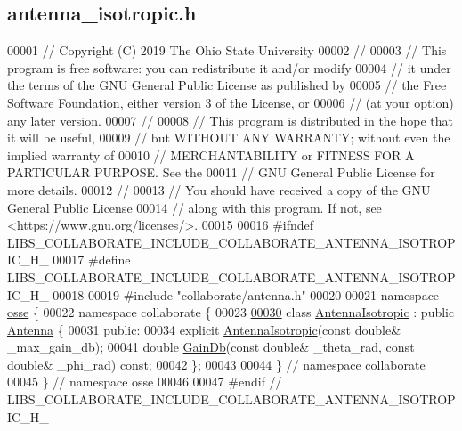 \hypertarget{antenna__isotropic_8h_source}{}\subsection{antenna\+\_\+isotropic.\+h}
\label{antenna__isotropic_8h_source}

\begin{DoxyCode}
00001 \textcolor{comment}{// Copyright (C) 2019 The Ohio State University}
00002 \textcolor{comment}{//}
00003 \textcolor{comment}{// This program is free software: you can redistribute it and/or modify}
00004 \textcolor{comment}{// it under the terms of the GNU General Public License as published by}
00005 \textcolor{comment}{// the Free Software Foundation, either version 3 of the License, or}
00006 \textcolor{comment}{// (at your option) any later version.}
00007 \textcolor{comment}{//}
00008 \textcolor{comment}{// This program is distributed in the hope that it will be useful,}
00009 \textcolor{comment}{// but WITHOUT ANY WARRANTY; without even the implied warranty of}
00010 \textcolor{comment}{// MERCHANTABILITY or FITNESS FOR A PARTICULAR PURPOSE.  See the}
00011 \textcolor{comment}{// GNU General Public License for more details.}
00012 \textcolor{comment}{//}
00013 \textcolor{comment}{// You should have received a copy of the GNU General Public License}
00014 \textcolor{comment}{// along with this program.  If not, see <https://www.gnu.org/licenses/>.}
00015 
00016 \textcolor{preprocessor}{#ifndef LIBS\_COLLABORATE\_INCLUDE\_COLLABORATE\_ANTENNA\_ISOTROPIC\_H\_}
00017 \textcolor{preprocessor}{#define LIBS\_COLLABORATE\_INCLUDE\_COLLABORATE\_ANTENNA\_ISOTROPIC\_H\_}
00018 
00019 \textcolor{preprocessor}{#include "collaborate/antenna.h"}
00020 
00021 \textcolor{keyword}{namespace }\hyperlink{namespaceosse}{osse} \{
00022 \textcolor{keyword}{namespace }collaborate \{
00023 
\hyperlink{classosse_1_1collaborate_1_1_antenna_isotropic}{00030} \textcolor{keyword}{class }\hyperlink{classosse_1_1collaborate_1_1_antenna_isotropic}{AntennaIsotropic} : \textcolor{keyword}{public} \hyperlink{classosse_1_1collaborate_1_1_antenna}{Antenna} \{
00031  \textcolor{keyword}{public}:
00034   \textcolor{keyword}{explicit} \hyperlink{classosse_1_1collaborate_1_1_antenna_isotropic_ae431744ad97d6b0a1d25039e94b4ffcb}{AntennaIsotropic}(\textcolor{keyword}{const} \textcolor{keywordtype}{double}& \_max\_gain\_db);
00041   \textcolor{keywordtype}{double} \hyperlink{classosse_1_1collaborate_1_1_antenna_isotropic_ab695187eb238b78ac03f27bd1cbffc11}{GainDb}(\textcolor{keyword}{const} \textcolor{keywordtype}{double}& \_theta\_rad, \textcolor{keyword}{const} \textcolor{keywordtype}{double}& \_phi\_rad) \textcolor{keyword}{const};
00042 \};
00043 
00044 \}  \textcolor{comment}{// namespace collaborate}
00045 \}  \textcolor{comment}{// namespace osse}
00046 
00047 \textcolor{preprocessor}{#endif  // LIBS\_COLLABORATE\_INCLUDE\_COLLABORATE\_ANTENNA\_ISOTROPIC\_H\_}
\end{DoxyCode}
